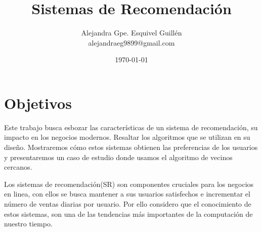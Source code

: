 \documentclass[a4paper]{article}
\date{\today}
\author{Alejandra Gpe. Esquivel Guillén \\ alejandraeg9899@gmail.com}
\title{Sistemas de Recomendación}
\begin{document}
\maketitle

\section{Objetivos}
Este trabajo busca esbozar las características de un sistema de recomendación, su impacto en los negocios modernos. Resaltar los algoritmos que se utilizan en su diseño. Mostraremos cómo estos sistemas obtienen las preferencias de los usuarios y presentaremos un caso de estudio donde usamos el algoritmo de vecinos cercanos. 

Los sistemas de recomendación(SR) son componentes cruciales para los negocios en linea, con ellos se busca mantener a sus usuarios satisfechos e incrementar el número de ventas diarias por usuario. Por ello considero que el conocimiento de estos sistemas, son una de las tendencias más importantes de la computación de nuestro tiempo.








\end{document}
